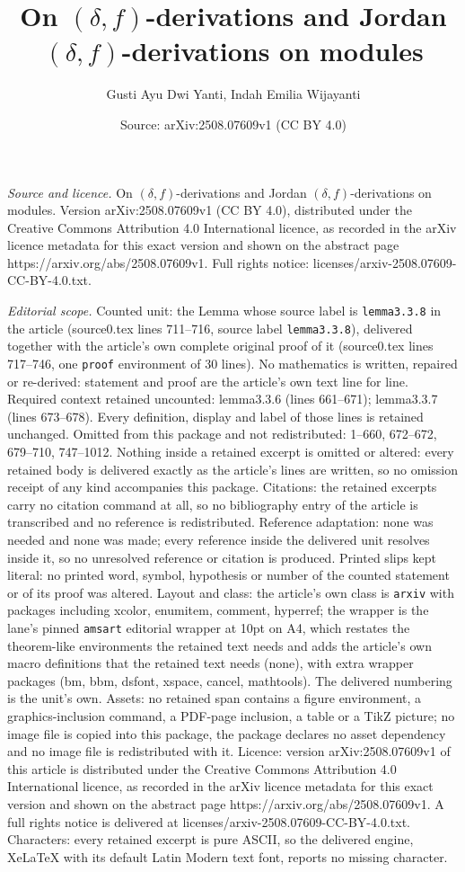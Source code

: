 \documentclass[10pt,a4paper]{amsart}
\title[On $(\delta,f)$-derivations and Jordan $(\delta,f)$-derivati]{On $(\delta,f)$-derivations and Jordan $(\delta,f)$-derivations on modules}
\author{Gusti Ayu Dwi Yanti, Indah Emilia Wijayanti}
\date{Source: arXiv:2508.07609v1 (CC BY 4.0)}
\begin{document}
\maketitle

\noindent\emph{Source and licence.} On $(\delta,f)$-derivations and Jordan $(\delta,f)$-derivations on modules. Version arXiv:2508.07609v1 (CC BY 4.0), distributed under the Creative Commons Attribution 4.0 International licence, as recorded in the arXiv licence metadata for this exact version and shown on the abstract page https://arxiv.org/abs/2508.07609v1. Full rights notice: licenses/arxiv-2508.07609-CC-BY-4.0.txt.\par\smallskip

\noindent\textit{Editorial scope.} Counted unit: the Lemma whose source label is \texttt{lemma3.3.8} in the article (source0.tex lines 711--716, source label \texttt{lemma3.3.8}), delivered together with the article's own complete original proof of it (source0.tex lines 717--746, one \texttt{proof} environment of 30 lines). No mathematics is written, repaired or re-derived: statement and proof are the article's own text line for line. Required context retained uncounted: lemma3.3.6 (lines 661--671); lemma3.3.7 (lines 673--678). Every definition, display and label of those lines is retained unchanged. Omitted from this package and not redistributed: 1--660, 672--672, 679--710, 747--1012. Nothing inside a retained excerpt is omitted or altered: every retained body is delivered exactly as the article's lines are written, so no omission receipt of any kind accompanies this package. Citations: the retained excerpts carry no citation command at all, so no bibliography entry of the article is transcribed and no reference is redistributed. Reference adaptation: none was needed and none was made; every reference inside the delivered unit resolves inside it, so no unresolved reference or citation is produced. Printed slips kept literal: no printed word, symbol, hypothesis or number of the counted statement or of its proof was altered. Layout and class: the article's own class is \texttt{arxiv} with packages including xcolor, enumitem, comment, hyperref; the wrapper is the lane's pinned \texttt{amsart} editorial wrapper at 10pt on A4, which restates the theorem-like environments the retained text needs and adds the article's own macro definitions that the retained text needs (none), with extra wrapper packages (bm, bbm, dsfont, xspace, cancel, mathtools). The delivered numbering is the unit's own. Assets: no retained span contains a figure environment, a graphics-inclusion command, a PDF-page inclusion, a table or a TikZ picture; no image file is copied into this package, the package declares no asset dependency and no image file is redistributed with it. Licence: version arXiv:2508.07609v1 of this article is distributed under the Creative Commons Attribution 4.0 International licence, as recorded in the arXiv licence metadata for this exact version and shown on the abstract page https://arxiv.org/abs/2508.07609v1. A full rights notice is delivered at licenses/arxiv-2508.07609-CC-BY-4.0.txt. Characters: every retained excerpt is pure ASCII, so the delivered engine, XeLaTeX with its default Latin Modern text font, reports no missing character.
\end{document}
